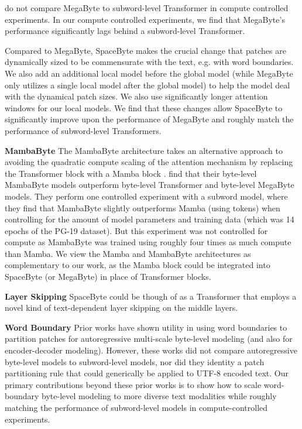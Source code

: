 \citet{megabyte} do not compare MegaByte to subword-level Transformer in compute controlled experiments. In our compute controlled experiments, we find that MegaByte's performance significantly lags behind a subword-level Transformer.

Compared to MegaByte, SpaceByte makes the crucial change that patches are dynamically sized to be commensurate with the text, e.g. with word boundaries. We also add an additional local model before the global model (while MegaByte only utilizes a single local model after the global model) to help the model deal with the dynamical patch sizes. We also use significantly longer attention windows for our local models. We find that these changes allow SpaceByte to significantly improve upon the performance of MegaByte and roughly match the performance of subword-level Transformers.

\textbf{MambaByte}
The MambaByte architecture \cite{mambabyte} takes an alternative approach to avoiding the quadratic compute scaling of the attention mechanism by replacing the Transformer block with a Mamba block \cite{gu2024mamba}.
\citet{mambabyte} find that their byte-level MambaByte models outperform byte-level Transformer and byte-level MegaByte models. They perform one controlled experiment with a subword model, where they find that MambaByte slightly outperforms Mamba (using tokens) when controlling for the amount of model parameters and training data (which was 14 epochs of the PG-19 dataset). But this experiment was not controlled for compute as MambaByte was trained using roughly four times as much compute than Mamba. We view the Mamba and MambaByte architectures as complementary to our work, as the Mamba block could be integrated into SpaceByte (or MegaByte) in place of Transformer blocks.

\textbf{Layer Skipping} SpaceByte could be though of as a Transformer that employs a novel kind of text-dependent layer skipping \cite{graves2016adaptive,wang2017skipnet,veit2017,wu2017blockdrop,schuster2021consistent,han2021dynamic,raposo2024MoD} on the middle layers.

\textbf{Word Boundary} Prior works have shown utility in using word boundaries to partition patches for autoregressive multi-scale byte-level modeling \cite{nawrot2022pooling,thawani2023wordpooled,Fleshman2023Toucan} (and also \cite{edman2022subword} for encoder-decoder modeling). However, these works did not compare autoregressive byte-level models to subword-level models, nor did they identity a patch partitioning rule that could generically be applied to UTF-8 encoded text. Our primary contributions beyond these prior works is to show how to scale word-boundary byte-level modeling to more diverse text modalities while roughly matching the performance of subword-level models in compute-controlled experiments.

